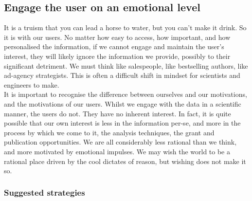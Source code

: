 \subsection{Engage the user on an emotional level}
It is a truism that you can lead a horse to water, but you can't make it drink. So it is with our users.
No matter how easy to access, how important, and how personalised the information, if we cannot engage and maintain the user's interest,
they will likely ignore the information we provide, possibly to their significant detriment.
We must think like salespeople, like bestselling authors, like ad-agency strategists.
This is often a difficult shift in mindset for scientists and engineers to make.\\

It is important to recognise the difference between ourselves and our motivations, and the motivations of our users. Whilst we engage with the data in a scientific
manner, the users do not. They have no inherent interest. In fact, it is quite possible that our own interest is less in the information per-se, and more in the process
by which we come to it, the analysis techniques, the grant and publication opportunities. We are all considerably less rational than we think, and more motivated by
emotional impulses. We may wish the world to be a rational place driven by the cool dictates of reason, but wishing does not make it so. \\

\subsubsection*{Suggested strategies}

